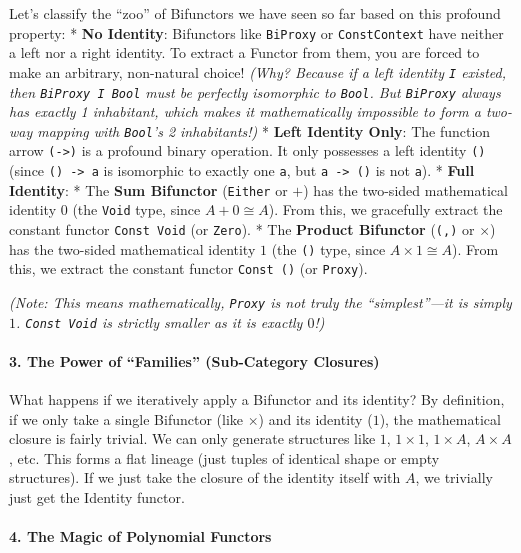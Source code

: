\documentclass[
]{article}
\begin{document}
Let's classify the ``zoo'' of Bifunctors we have seen so far based on
this profound property: * \textbf{No Identity}: Bifunctors like
\texttt{BiProxy} or \texttt{ConstContext} have neither a left nor a
right identity. To extract a Functor from them, you are forced to make
an arbitrary, non-natural choice! \emph{(Why? Because if a left identity
\texttt{I} existed, then \texttt{BiProxy\ I\ Bool} must be perfectly
isomorphic to \texttt{Bool}. But \texttt{BiProxy} always has exactly 1
inhabitant, which makes it mathematically impossible to form a two-way
mapping with \texttt{Bool}'s 2 inhabitants!)} * \textbf{Left Identity
Only}: The function arrow \texttt{(-\textgreater{})} is a profound
binary operation. It only possesses a left identity \texttt{()} (since
\texttt{()\ -\textgreater{}\ a} is isomorphic to exactly one \texttt{a},
but \texttt{a\ -\textgreater{}\ ()} is not \texttt{a}). * \textbf{Full
Identity}: * The \textbf{Sum Bifunctor} (\texttt{Either} or \(+\)) has
the two-sided mathematical identity \(0\) (the \texttt{Void} type, since
\(A + 0 \cong A\)). From this, we gracefully extract the constant
functor \texttt{Const\ Void} (or \texttt{Zero}). * The \textbf{Product
Bifunctor} (\texttt{(,)} or \(\times\)) has the two-sided mathematical
identity \(1\) (the \texttt{()} type, since \(A \times 1 \cong A\)).
From this, we extract the constant functor \texttt{Const\ ()} (or
\texttt{Proxy}).

\emph{(Note: This means mathematically, \texttt{Proxy} is not truly the
``simplest''---it is simply \(1\). \texttt{Const\ Void} is strictly
smaller as it is exactly \(0\)!)}

\paragraph{3. The Power of ``Families'' (Sub-Category
Closures)}\label{the-power-of-families-sub-category-closures}

What happens if we iteratively apply a Bifunctor and its identity? By
definition, if we only take a single Bifunctor (like \(\times\)) and its
identity (\(1\)), the mathematical closure is fairly trivial. We can
only generate structures like \(1\), \(1 \times 1\), \(1 \times A\),
\(A \times A\), etc. This forms a flat lineage (just tuples of identical
shape or empty structures). If we just take the closure of the identity
itself with \(A\), we trivially just get the Identity functor.

\paragraph{4. The Magic of Polynomial
Functors}\label{the-magic-of-polynomial-functors}
\end{document}
